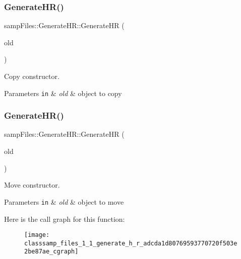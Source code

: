\subsubsection{\texorpdfstring{Generate\+H\+R()}{GenerateHR()}\hspace{0.1cm}{\footnotesize\ttfamily [1/2]}}
{\footnotesize\ttfamily samp\+Files\+::\+Generate\+H\+R\+::\+Generate\+HR (\begin{DoxyParamCaption}\item[{const \hyperlink{classsamp_files_1_1_generate_h_r}{Generate\+HR} \&}]{old }\end{DoxyParamCaption})\hspace{0.3cm}{\ttfamily [inline]}}



Copy constructor. 


\begin{DoxyParams}[1]{Parameters}
\mbox{\tt in}  & {\em old} & object to copy \\
\hline
\end{DoxyParams}
\mbox{\label{classsamp_files_1_1_generate_h_r_adcda1d80769593770720f503e2be87ae}} 
\subsubsection{\texorpdfstring{Generate\+H\+R()}{GenerateHR()}\hspace{0.1cm}{\footnotesize\ttfamily [2/2]}}
{\footnotesize\ttfamily samp\+Files\+::\+Generate\+H\+R\+::\+Generate\+HR (\begin{DoxyParamCaption}\item[{\hyperlink{classsamp_files_1_1_generate_h_r}{Generate\+HR} \&\&}]{old }\end{DoxyParamCaption})\hspace{0.3cm}{\ttfamily [inline]}}



Move constructor. 


\begin{DoxyParams}[1]{Parameters}
\mbox{\tt in}  & {\em old} & object to move \\
\hline
\end{DoxyParams}
Here is the call graph for this function\+:\nopagebreak
\begin{figure}[H]
\begin{center}
\leavevmode
\texttt{[image: classsamp\_files\_1\_1\_generate\_h\_r\_adcda1d80769593770720f503e2be87ae\_cgraph]}
\end{center}
\end{figure}


